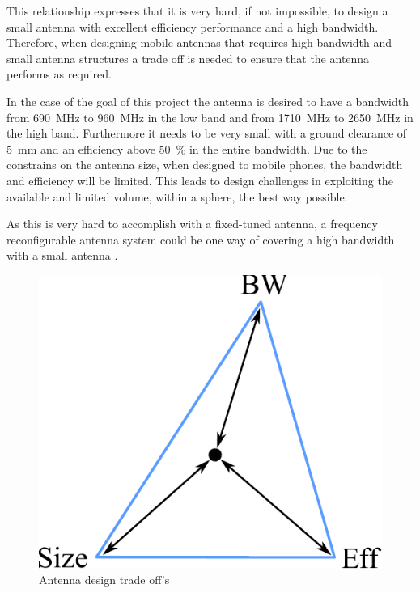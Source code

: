 This relationship expresses that it is very hard, if not impossible, to design a small antenna with excellent efficiency performance and a high bandwidth.
Therefore, when designing mobile antennas that requires high bandwidth and small antenna structures a trade off is needed to ensure that the antenna performs as required\cite{hilbert2015tradeoff}.

In the case of the goal of this project the antenna is desired to have a bandwidth from \SI{690}{MHz} to \SI{960}{MHz} in the low band and from \SI{1710}{MHz} to \SI{2650}{MHz} in the high band. Furthermore it needs to be very small with a ground clearance of \SI{5}{mm} and an efficiency above \SI{50}{\percent} in the entire bandwidth. Due to the constrains on the antenna size, when designed to mobile phones, the bandwidth and efficiency will be limited. This leads to design challenges in exploiting the available and limited volume, within a sphere, the best way possible\cite{balanis2012antenna}.  

As this is very hard to accomplish with a fixed-tuned antenna, a frequency reconfigurable antenna system could be one way of covering a high bandwidth with a small antenna \cite{hilbert2015tradeoff}.  

\begin{figure}[htbp]
  \centering
  \includegraphics[scale=0.4]{img/analysis/antenna_limitations}
  \caption{Antenna design trade off's}
  \label{fig:antenna_tradeoff}
\end{figure}

